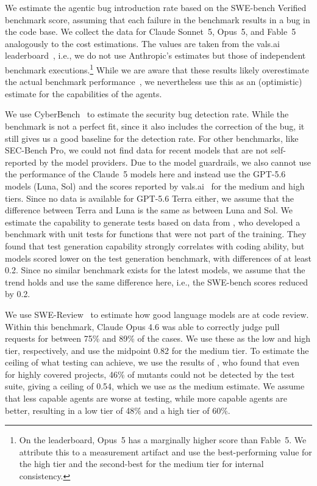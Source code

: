 \documentclass[smallextended]{svjour3}       %
\begin{document}
We estimate the agentic bug introduction rate based on the SWE-bench Verified benchmark score, assuming that each failure in the benchmark results in a bug in the code base. We collect the data for Claude Sonnet~5, Opus~5, and Fable~5 analogously to the cost estimations. The values are taken from the vals.ai leaderboard~\citep{valsai2026swebench}, i.e., we do not use Anthropic's estimates but those of independent benchmark executions.\footnote{On the leaderboard, Opus~5 has a marginally higher score than Fable~5. We attribute this to a measurement artifact and use the best-performing value for the high tier and the second-best for the medium tier for internal consistency.} While we are aware that these results likely overestimate the actual benchmark performance~\citep{liang2026swe}, we nevertheless use this as an (optimistic) estimate for the capabilities of the agents.

We use CyberBench~\citep{liu2024cyberbench} to estimate the security bug detection rate. While the benchmark is not a perfect fit, since it also includes the correction of the bug, it still gives us a good baseline for the detection rate. For other benchmarks, like SEC-Bench Pro, we could not find data for recent models that are not self-reported by the model providers. Due to the model guardrails, we also cannot use the performance of the Claude~5 models here and instead use the GPT-5.6 models (Luna, Sol) and the scores reported by vals.ai~\citep{valsai2026swebench} for the medium and high tiers. Since no data is available for GPT-5.6 Terra either, we assume that the difference between Terra and Luna is the same as between Luna and Sol. We estimate the capability to generate tests based on data from \cite{huang2025benchmarking}, who developed a benchmark with unit tests for functions that were not part of the training. They found that test generation capability strongly correlates with coding ability, but models scored lower on the test generation benchmark, with differences of at least 0.2. Since no similar benchmark exists for the latest models, we assume that the trend holds and use the same difference here, i.e., the SWE-bench scores reduced by 0.2.

We use SWE-Review~\citep{wang2026swe} to estimate how good language models are at code review. Within this benchmark, Claude Opus 4.6 was able to correctly judge pull requests for between 75\% and 89\% of the cases. We use these as the low and high tier, respectively, and use the midpoint 0.82 for the medium tier. To estimate the ceiling of what testing can achieve, we use the results of \cite{SCHWARTZ2018106}, who found that even for highly covered projects, 46\% of mutants could not be detected by the test suite, giving a ceiling of 0.54, which we use as the medium estimate. We assume that less capable agents are worse at testing, while more capable agents are better, resulting in a low tier of 48\% and a high tier of 60\%.
\end{document}
